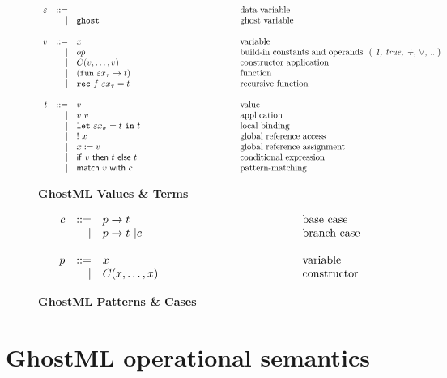 \documentclass[a4paper,11pt,oneside]{article}
\begin{document}
\begin{small}
\begin{figure}[!h]\vspace*{-0.5cm}
\begin{displaymath}
  \begin{array}{rrl@{\hspace*{4cm} }l}
  \grhead{\varepsilon}{\quad}{data variable}
  \grcase{\texttt{ghost}}{ghost variable} \\
  
  \grhead{v}{x}{variable}
  \grcase{op}{build-in constants and operands \ ( \textit{1, true, +}, $\vee$, ...)}
  \grcase{C(v,\dots, v)}{constructor application}
  \grcase{(\texttt{fun} \ \varepsilon x_{\tau} \rightarrow t)}{function}
  \grcase{ \texttt{rec} \ f \ \varepsilon x_{\tau}   =  t}{recursive function} \\

  \grhead{t}{v}{value}
  \grcase{v ~ v}{application}
  \grcase{\texttt{let}~\varepsilon x_{\sigma} = t \ \texttt{in} \ t}{local binding}
  \grcase{!~x}{global reference access}
  \grcase{x := v}{global reference assignment}
  \grcase{\mathsf{if}~v~\mathsf{then}~t~\mathsf{else}~t }{conditional expression}
  \grcase{\mathsf{match} ~v ~ \mathsf{with} ~ c	}{pattern-matching}
  \end{array} 
\end{displaymath} \vspace*{-0.5cm}
\caption*{ \textbf{GhostML Values \& Terms} \hfill}
\end{figure}

\begin{figure}[!h]
\begin{displaymath}
  \begin{array}{rrl@{\hspace*{4.5cm}}l}
  \grhead{c}{p -> t}{base case}
  \grcase{p -> t  ~|c}{branch case} \\
  \grhead{p}{x}{variable}
  \grcase{C(x,\dots, x)}{constructor}
  \end{array} 
\end{displaymath} \vspace*{-0.5cm}
\caption*{ \textbf{GhostML Patterns \& Cases} \hfill}
\end{figure}
\end{small}
\newpage

\label{GhostML operational semantics}
\section*{GhostML  operational semantics}
\end{document}
